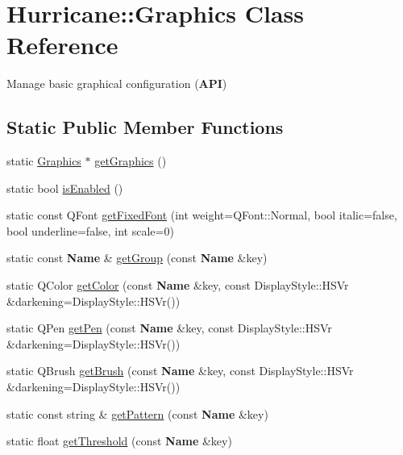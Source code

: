 \hypertarget{classHurricane_1_1Graphics}{}\section{Hurricane\+:\+:Graphics Class Reference}
\label{classHurricane_1_1Graphics}


Manage basic graphical configuration ({\bfseries A\+PI})  


\subsection*{Static Public Member Functions}
\begin{DoxyCompactItemize}
\item 
static \hyperlink{classHurricane_1_1Graphics}{Graphics} $\ast$ \hyperlink{classHurricane_1_1Graphics_a4f8d6eaeef8d9ae781be929e95545f0c}{get\+Graphics} ()
\item 
static bool \hyperlink{classHurricane_1_1Graphics_a02964067103bdd4c27bbf4af91a47cf8}{is\+Enabled} ()
\item 
static const Q\+Font \hyperlink{classHurricane_1_1Graphics_a30322de9fd4a042d8773465c622a1650}{get\+Fixed\+Font} (int weight=Q\+Font\+::\+Normal, bool italic=false, bool underline=false, int scale=0)
\item 
static const \textbf{ Name} \& \hyperlink{classHurricane_1_1Graphics_a1262f31f53c2c36440e1e05fd2da17fc}{get\+Group} (const \textbf{ Name} \&key)
\item 
static Q\+Color \hyperlink{classHurricane_1_1Graphics_abaa552c464f1a664dc77cc0c0118c35c}{get\+Color} (const \textbf{ Name} \&key, const Display\+Style\+::\+H\+S\+Vr \&darkening=Display\+Style\+::\+H\+S\+Vr())
\item 
static Q\+Pen \hyperlink{classHurricane_1_1Graphics_a0197c915f8d76c3798cf19ea2d878834}{get\+Pen} (const \textbf{ Name} \&key, const Display\+Style\+::\+H\+S\+Vr \&darkening=Display\+Style\+::\+H\+S\+Vr())
\item 
static Q\+Brush \hyperlink{classHurricane_1_1Graphics_ad67a43df460d5c5d5179a81d2a72c9a9}{get\+Brush} (const \textbf{ Name} \&key, const Display\+Style\+::\+H\+S\+Vr \&darkening=Display\+Style\+::\+H\+S\+Vr())
\item 
static const string \& \hyperlink{classHurricane_1_1Graphics_a08111e942b095327fa6031dca7c96e8e}{get\+Pattern} (const \textbf{ Name} \&key)
\item 
static float \hyperlink{classHurricane_1_1Graphics_a2291edddc743edc44fdea26437f3095f}{get\+Threshold} (const \textbf{ Name} \&key)

\end{DoxyCompactItemize}
